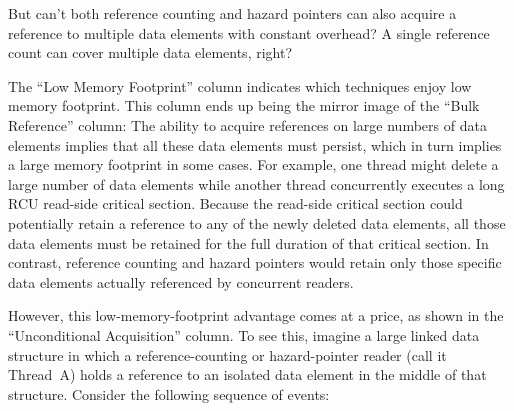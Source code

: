 \QuickQuiz{}
	But can't both reference counting and hazard pointers can also acquire
	a reference to multiple data elements with constant overhead?
	A single reference count can cover multiple data elements, right?
 \QuickQuizEnd

The ``Low Memory Footprint'' column indicates which techniques enjoy low
memory footprint.
This column ends up being the mirror image of the ``Bulk Reference''
column: The ability to acquire references on large numbers of data
elements implies that all these data elements must persist, which
in turn implies a large memory footprint in some cases.
For example, one thread might delete a large number of data
elements while another thread concurrently executes a long RCU read-side
critical section.
Because the read-side critical section could potentially retain a reference
to any of the newly deleted data elements, all those data elements must
be retained for the full duration of that critical section.
In contrast, reference counting and hazard pointers would retain only
those specific data elements actually referenced by concurrent readers.

However, this low-memory-footprint advantage comes at a price, as shown
in the ``Unconditional Acquisition'' column.
To see this, imagine a large linked data structure in which a
reference-counting or hazard-pointer reader (call it Thread~A)
holds a reference to
an isolated data element in the middle of that structure.
Consider the following sequence of events:

